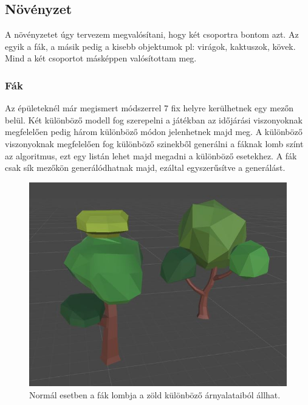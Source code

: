 \subsection{Növényzet}

A növényzetet úgy tervezem megvalósítani, hogy két csoportra bontom azt. Az egyik a fák, a másik pedig a kisebb objektumok pl: virágok, kaktuszok, kövek.  Mind a két csoportot másképpen valósítottam meg.

\subsubsection{Fák}

Az épületeknél már megismert módszerrel 7 fix helyre kerülhetnek egy mezőn belül. Két különböző modell fog szerepelni a játékban az időjárási viszonyoknak megfelelően pedig három különböző módon jelenhetnek majd meg. A különböző viszonyoknak megfelelően fog különböző szinekből generálni a fáknak lomb színt az algoritmus, ezt egy listán lehet majd megadni a különböző esetekhez. A fák csak sík mezőkön generálódhatnak majd, ezáltal egyszerűsítve a generálást.

\begin{figure}[h!]
\centering
\includegraphics[scale=0.5]{kepek/img11_4_7_1.JPG}
\caption{Normál esetben a fák lombja a zöld különböző árnyalataiból állhat.}
\label{fig:img11_4_7_1}
\end{figure}

